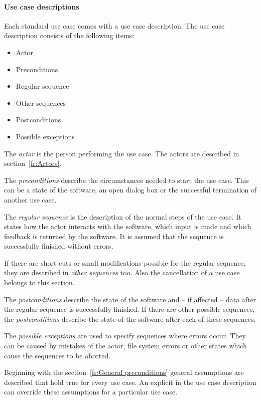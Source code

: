 \paragraph{Use case descriptions}
Each standard use case comes with a use case description. The use case description consists of the following items:
\begin{itemize}
  \item Actor
  \item Preconditions
  \item Regular sequence
  \item Other sequences
  \item Postconditions
  \item Possible exceptions
\end{itemize}
\par
The \textit{actor} is the person performing the use case. The actors are described in section~\ref{fr:Actors}.
\par
The \textit{preconditions} describe the circumstances needed to start the use case. This can be a state of the software, an open dialog box or the successful termination of another use case.
\par
The \textit{regular sequence} is the description of the normal steps of the use case. It states how the actor interacts with the software, which input is made and which feedback is returned by the software. It is assumed that the sequence is successfully finished without errors. 
\par
If there are short cuts or small modifications possible for the regular sequence, they are described in \textit{other sequences} too. Also the cancellation of a use case belongs to this section.
\par
The \textit{postconditions} describe the state of the software and -- if affected -- data after the regular sequence is successfully finished. If there are other possible sequences, the \textit{postconditions} describe the state of the software after each of these sequences.
\par
The \textit{possible exceptions} are used to specify sequences where errors occur. They can be caused by mistakes of the actor, file system errors or other states which cause the sequences to be aborted.
\par
Beginning with the section~\ref{fr:General preconditions} general assumptions are described that hold true for every use case. An explicit  in the use case description can override these assumptions for a particular use case.

